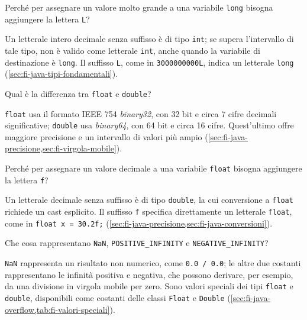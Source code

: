 \begin{exercise}
\label{ex:fi-esercizi-java-collaudo-letterale-long}
Perché per assegnare un valore molto grande a una variabile \texttt{long}
bisogna aggiungere la lettera \texttt{L}?
\end{exercise}

Un letterale intero decimale senza suffisso è di tipo \texttt{int}; se
supera l'intervallo di tale tipo, non è valido come letterale
\texttt{int}, anche quando la variabile di destinazione è
\texttt{long}. Il suffisso \texttt{L}, come in
\texttt{3000000000L}, indica un letterale \texttt{long}
(\cref{sec:fi-java-tipi-fondamentali}).

\begin{exercise}
\label{ex:fi-esercizi-java-collaudo-float-double}
Qual è la differenza tra \texttt{float} e \texttt{double}?
\end{exercise}

\texttt{float} usa il formato IEEE 754 \emph{binary32}, con 32 bit e circa
7 cifre decimali significative; \texttt{double} usa \emph{binary64}, con
64 bit e circa 16 cifre. Quest'ultimo offre maggiore precisione e un
intervallo di valori più ampio
(\cref{sec:fi-java-precisione,sec:fi-virgola-mobile}).

\begin{exercise}
\label{ex:fi-esercizi-java-collaudo-letterale-float}
Perché per assegnare un valore decimale a una variabile \texttt{float}
bisogna aggiungere la lettera \texttt{f}?
\end{exercise}

Un letterale decimale senza suffisso è di tipo \texttt{double}, la cui
conversione a \texttt{float} richiede un cast esplicito.
Il suffisso \texttt{f} specifica direttamente un letterale
\texttt{float}, come in \texttt{float x = 30.2f;}
(\cref{sec:fi-java-precisione,sec:fi-java-conversioni}).

\begin{exercise}
\label{ex:fi-esercizi-java-collaudo-nan-infinita}
Che cosa rappresentano \texttt{NaN}, \texttt{POSITIVE\_INFINITY} e
\texttt{NEGATIVE\_INFINITY}?
\end{exercise}

\texttt{NaN} rappresenta un risultato non numerico, come
\texttt{0.0 / 0.0}; le altre due costanti rappresentano le
infinità positiva e negativa, che possono derivare, per esempio,
da una divisione in virgola mobile per zero. Sono valori speciali
dei tipi \texttt{float} e \texttt{double}, disponibili come costanti delle classi \texttt{Float} e
\texttt{Double} (\cref{sec:fi-java-overflow,tab:fi-valori-speciali}).

